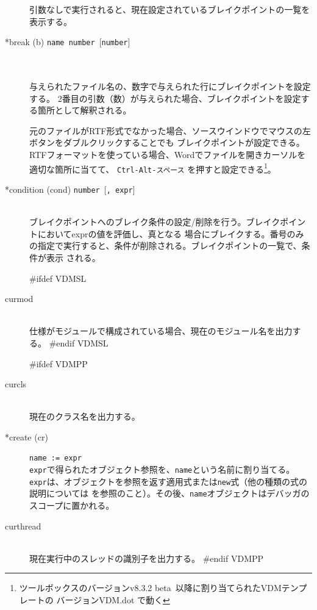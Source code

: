 \documentclass[\pformat,12pt]{article}
\newcommand{\vdmtoolsver}{v8.3.2 beta}
\newcommand{\vdmtoolsver}{v8.3.2}
\newcommand{\guicmd}[1]{{\sf #1}}
\newcommand{\guicmd}[1]{{\gt #1}}
\begin{document}
\begin{description}
  引数なしで実行されると、現在設定されているブレイクポイントの一覧を表示する。

\item[*break (b) \mbox{\texttt{name number} [\texttt{number}]}]\mbox{}\\
\mbox{}\\
 与えられたファイル名の、数字で与えられた行にブレイクポイントを設定する。
 2番目の引数（数）が与えられた場合、ブレイクポイントを設定する箇所として解釈される。

元のファイルがRTF形式でなかった場合、\guicmd{ソースウインドウ}でマウスの左ボタンをダブルクリックすることでも
ブレイクポイントが設定できる。
RTFフォーマットを使っている場合、Wordでファイルを開きカーソルを適切な箇所に当てて、
\texttt{Ctrl-Alt-スペース}%
を押すと設定できる\footnote{ツールボックスのバージョン\vdmtoolsver\ 以降に割り当てられたVDMテンプレートの
バージョンVDM.dot で動く}。 

\item[*condition (cond) \mbox{\texttt{number} [\texttt{, expr}]}]\mbox{}\\
  ブレイクポイントへのブレイク条件の設定/削除を行う。ブレイクポイントにおいてexprの値を評価し、真となる
  場合にブレイクする。番号のみの指定で実行すると、条件が削除される。ブレイクポイントの一覧で、条件が表示
  される。

#ifdef VDMSL
\item[curmod] \mbox{}\\
  仕様がモジュールで構成されている場合、現在のモジュール名を出力する。
#endif VDMSL

#ifdef VDMPP
\item[curcls] \mbox{}\\
  現在のクラス名を出力する。

\item[*create (cr)] {\tt name := expr}\mbox{}\\
  {\tt expr}で得られたオブジェクト参照を、{\tt name}という名前に割り当てる。
  {\tt expr}は、オブジェクトを参照を返す適用式または{\tt new}式（他の種類の式の説明については
  \cite{LangManPP-SCSK}を参照のこと）。その後、{\tt name}オブジェクトはデバッガのスコープに置かれる。
  
\item[curthread]\mbox{}\\
  現在実行中のスレッドの識別子を出力する。
#endif VDMPP


\end{description}
\end{document}
